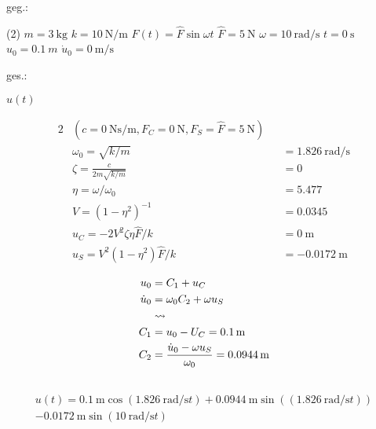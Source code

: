 \vspace{1em}

\begin{minipage}[t]{.49\linewidth}
geg.:
\begin{tasks}(2)
    \task[] $m = \SI{3}{\kilo\gram}$
    \task[] $k = \SI{10}{\newton\per\meter}$
    \task[] $F(t) = \hat{F} \sin{\omega t}$
    \task[] $\hat{F} = \SI{5}{\newton}$
    \task[] $\omega = \SI{10}{\radian\per\second}$
    \task[] $t=\SI{0}{\second}$
    \task[] $u_0 = \SI{0.1}{m}$
    \task[] $\dot{u}_0 = \SI{0}{\meter\per\second}$
\end{tasks}
\end{minipage}
\begin{minipage}[t]{.49\linewidth}
ges.:
\begin{tasks}
    \task $u(t)$
\end{tasks}
\end{minipage}

\begin{solution}
    \begin{alignat*}{2}
        &(c = \SI{0}{\newton\second\per\meter}, F_C = \SI{0}{\newton}, F_S = \hat{F} = \SI{5}{\newton})\\
        &\omega_0 = \sqrt{k/m} &&= \SI{1.826}{\radian\per\second} \\
        &\zeta = \frac{c}{2m\sqrt{k/m}} &&= 0 \\
        &\eta = \omega/\omega_0 &&= 5.477\\
        &V = (1-\eta^2)^{-1} &&=  0.0345 \\
        &u_C = -2V^2\zeta\eta\hat{F}/k &&= \SI{0}{\meter} \\
        &u_S = V^2(1-\eta^2)\hat{F}/k &&= \SI{-0.0172}{\meter}
    \end{alignat*}

    \begin{align*}
        u_0 &= C_1 + u_C \\
        \dot{u}_0 &= \omega_0 C_2+\omega u_S\\
        &\rightsquigarrow \\
        C_1 &=  u_0 - U_C = \SI{0.1}{\meter}\\
        C_2 &= \frac{\dot{u}_0 - \omega u_S}{\omega_0} = \SI{0.0944}{\meter} \\
        \vspace{1cm}
    \end{align*}
    \begin{equation*}
        \begin{split}
            u(t) = \SI{0.1}{\meter} \cos{(\SI{1.826}{\radian\per\second} t)} +\SI{0.0944}{\meter} \sin{((\SI{1.826}{\radian\per\second} t))} \\ - \SI{0.0172}{\meter}\sin{(\SI{10}{\radian\per\second} t)}
        \end{split}
    \end{equation*}
\end{solution}
    
